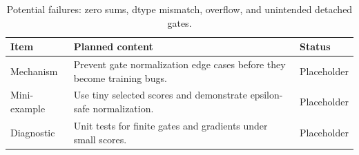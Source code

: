 \begin{table}[H]
\centering
\caption{Potential failures: zero sums, dtype mismatch, overflow, and unintended detached gates.}
\label{tab:ch05-numerical-stability-in-top-k-gates}
\begin{tabularx}{\textwidth}{p{}X p{}}
\toprule
Item & Planned content & Status \\
\midrule
Mechanism & Prevent gate normalization edge cases before they become training bugs. & Placeholder \\
Mini-example & Use tiny selected scores and demonstrate epsilon-safe normalization. & Placeholder \\
Diagnostic & Unit tests for finite gates and gradients under small scores. & Placeholder \\
\bottomrule
\end{tabularx}
\end{table}
